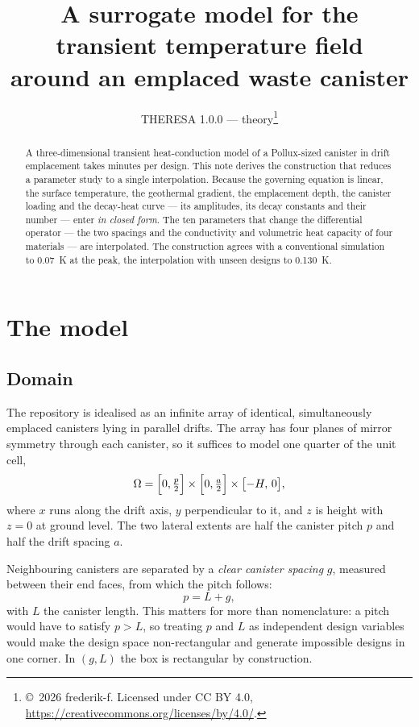\documentclass[11pt,a4paper]{article}
\title{A surrogate model for the transient temperature field\\
       around an emplaced waste canister}
\author{THERESA 1.0.0 --- theory\thanks{\copyright\ 2026 frederik-f.
  Licensed under CC BY 4.0, \url{https://creativecommons.org/licenses/by/4.0/}.}}
\date{}
\theoremstyle{plain}
\begin{document}
\maketitle

\begin{abstract}
\noindent
A three-dimensional transient heat-conduction model of a Pollux-sized canister
in drift emplacement takes minutes per design. This note derives the
construction that reduces a parameter study to a single interpolation. Because
the governing equation is linear, the surface temperature, the geothermal
gradient, the emplacement depth, the canister loading and the decay-heat curve
--- its amplitudes, its decay constants and their number --- enter \emph{in
closed form}. The ten parameters that change the differential operator --- the
two spacings and the conductivity and volumetric heat capacity of four
materials --- are interpolated. The construction agrees with a conventional
simulation to \SI{0.07}{\kelvin} at the peak, the interpolation with unseen
designs to \SI{0.130}{\kelvin}.
\end{abstract}

\section{The model}

\subsection{Domain}

The repository is idealised as an infinite array of identical, simultaneously
emplaced canisters lying in parallel drifts. The array has four planes of
mirror symmetry through each canister, so it suffices to model one quarter of
the unit cell,
\[
  \Omega = \Bigl[0, \tfrac{p}{2}\Bigr] \times
           \Bigl[0, \tfrac{a}{2}\Bigr] \times
           \bigl[-H,\, 0\bigr],
\]
where $x$ runs along the drift axis, $y$ perpendicular to it, and $z$ is height
with $z = 0$ at ground level. The two lateral extents are half the canister
pitch $p$ and half the drift spacing $a$.

Neighbouring canisters are separated by a \emph{clear canister spacing} $g$,
measured between their end faces, from which the pitch follows:
\begin{equation}
  p = L + g,
  \label{eq:pitch}
\end{equation}
with $L$ the canister length. This matters for more than nomenclature: a pitch
would have to satisfy $p > L$, so treating $p$ and $L$ as independent design
variables would make the design space non-rectangular and generate impossible
designs in one corner. In $(g, L)$ the box is rectangular by construction.
\end{document}
